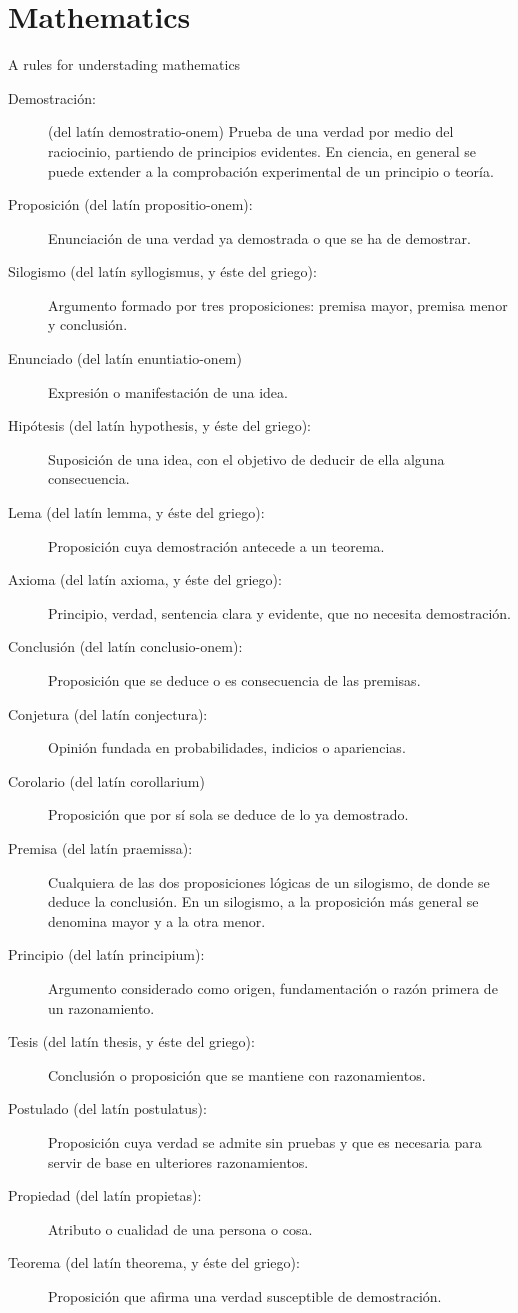 
\part{Mathematics}

A rules for understading mathematics
\begin{description}
    \item[Demostraci\'on: ] (del lat\'in demostratio-onem) Prueba de una verdad por medio del raciocinio, partiendo de principios evidentes. En ciencia, en general se puede extender a la comprobaci\'on experimental de un principio o teor\'ia.
    \item[Proposici\'on (del lat\'in propositio-onem): ] Enunciaci\'on de una verdad ya demostrada o que se ha de demostrar.
    \item[Silogismo (del lat\'in syllogismus, y \'este del griego): ] Argumento formado por tres proposiciones: premisa mayor, premisa menor y conclusi\'on. 
    \item[Enunciado (del lat\'in enuntiatio-onem)] Expresi\'on o manifestaci\'on de una idea.
    \item[Hip\'otesis (del lat\'in hypothesis, y \'este del griego): ] Suposici\'on de una idea, con el objetivo de deducir de ella alguna consecuencia.
    \item[Lema (del lat\'in lemma, y \'este del griego): ]      Proposici\'on cuya demostraci\'on antecede a un teorema.
    \item[Axioma (del lat\'in axioma, y \'este del griego): ]      Principio, verdad, sentencia clara y evidente, que no necesita demostraci\'on.
    \item[Conclusi\'on (del lat\'in conclusio-onem): ] Proposici\'on que se deduce o es consecuencia de las premisas.
    \item[Conjetura (del lat\'in conjectura): ] Opini\'on fundada en probabilidades, indicios o apariencias.
    \item[ Corolario (del lat\'in corollarium)] Proposici\'on que por s\'i sola se deduce de lo ya demostrado.
    \item[Premisa (del lat\'in praemissa): ]      Cualquiera de las dos proposiciones l\'ogicas de un silogismo, de donde se deduce la conclusi\'on. En un silogismo, a la proposici\'on más general se denomina mayor y a la otra menor.
    \item[ Principio (del lat\'in principium): ] Argumento considerado como origen, fundamentaci\'on o raz\'on primera de un razonamiento.
    \item[ Tesis (del lat\'in thesis, y \'este del griego): ] Conclusi\'on o proposici\'on que se mantiene con razonamientos.
    \item[Postulado (del lat\'in postulatus): ] Proposici\'on cuya verdad se admite sin pruebas y que es necesaria para servir de base en ulteriores razonamientos.
    \item[Propiedad (del lat\'in propietas): ] Atributo o cualidad de una persona o cosa.
    \item[Teorema (del lat\'in theorema, y \'este del griego): ] Proposici\'on que afirma una verdad susceptible de demostraci\'on.    
\end{description}
